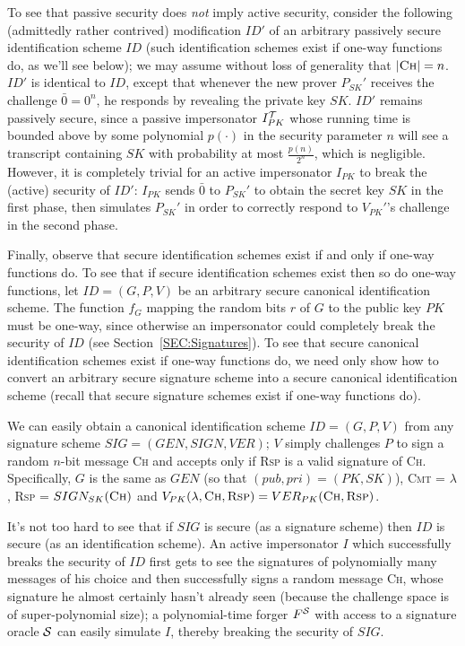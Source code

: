 To see that passive security does {\it not} imply active security, consider
the following (admittedly rather contrived) modification $ID'$ of an arbitrary passively secure
identification scheme $ID$ (such identification schemes exist if one-way
functions do, as we'll see below); we may assume without loss of generality that
$|\textsc{Ch}| = n$. $ID'$ is identical to $ID$, except that whenever the new
prover $P_{SK}'$ receives the challenge $\bar{0} = 0^n$, he responds by
revealing the private key $SK$. $ID'$ remains passively secure, since a
passive impersonator $I_{PK}^{\mathcal{T}}$ whose running time is bounded above by
some polynomial $p(\cdot)$ in the security parameter $n$ will see a transcript
containing $SK$ with probability at most $\frac{p(n)}{2^n}$, which is
negligible. However, it is completely trivial for an active impersonator
$I_{PK}$ to break the (active) security of $ID'$: $I_{PK}$ sends $\bar{0}$ to
$P_{SK}'$ to obtain the secret key $SK$ in the first phase, then simulates
$P_{SK}'$ in order to correctly respond to $V_{PK}'$'s challenge in the second phase.

Finally, observe that secure identification schemes exist if and only if
one-way functions do. To see that if secure identification schemes exist then
so do one-way functions, let $ID = (G,P,V)$ be an arbitrary secure canonical
identification scheme. The function $f_{G}$ mapping the random
bits $r$ of $G$ to the public key $PK$ must be one-way, since otherwise an
impersonator could completely break the security of $ID$ (see
Section~\ref{SEC:Signatures}). To see that secure canonical identification
schemes exist if one-way functions do, we need only show how to convert
an arbitrary secure signature scheme into a secure canonical identification
scheme (recall that secure signature schemes exist if one-way functions do). 

We can easily obtain a canonical identification scheme $ID = (G,P,V)$ from any
signature scheme $SIG = (GEN,SIGN,VER)$; $V$ simply challenges $P$ to sign a
random $n$-bit message \textsc{Ch} and accepts only if \textsc{Rsp} is a valid
signature of \textsc{Ch}. Specifically, $G$ is the same as
$GEN$ (so that $(pub,pri) = (PK,SK)$), \textsc{Cmt} = $\lambda$, \textsc{Rsp}
= $SIGN_{SK}(\textsc{Ch})$ and $V_{PK}(\lambda,\textsc{Ch},\textsc{Rsp}) =
VER_{PK}(\textsc{Ch},\textsc{Rsp})$. 

It's not too hard to see that if $SIG$ is secure (as a signature scheme) then
$ID$ is secure (as an identification scheme). An active
impersonator $I$ which successfully breaks the security of $ID$ first gets to
see the signatures of polynomially many messages of his choice and then
successfully signs a random message \textsc{Ch}, whose signature he almost
certainly hasn't already seen (because the challenge space is of
super-polynomial size); a polynomial-time forger $F^{\mathcal{S}}$ with access to a
signature oracle $\mathcal{S}$ can easily simulate $I$, thereby breaking the security
of $SIG$. 


